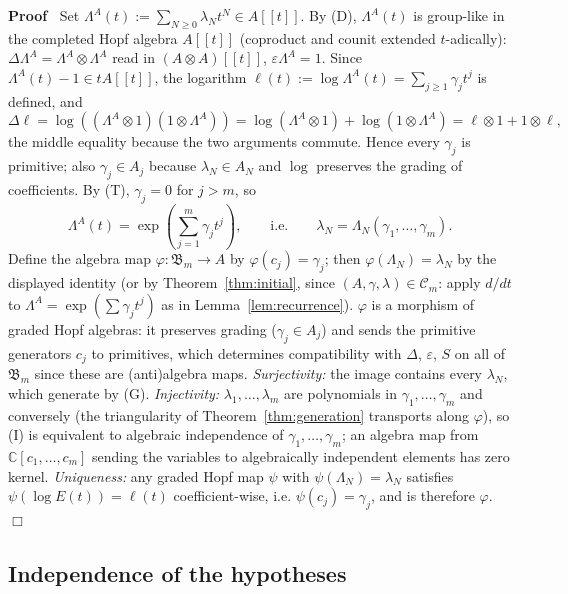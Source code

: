 \documentclass{article}
\newcommand{\assign}{:=}
\newcommand{\tmem}[1]{{\em #1\/}}
\newenvironment{proof}{\noindent\textbf{Proof\ }}{\hspace*{\fill}$\Box$\medskip}
\newcommand{\CA}{\mathfrak{B}}
\newcommand{\C}{\mathbb{C}}
\begin{document}
\begin{proof}
  Set $\Lambda^A (t) \assign \sum_{N \ge 0} \lambda_N t^N \in A [[t]]$. By
  (D), $\Lambda^A (t)$ is group-like in the completed Hopf algebra $A [[t]]$
  (coproduct and counit extended $t$-adically): $\Delta \Lambda^A = \Lambda^A
  \otimes \Lambda^A$ read in $(A \otimes A) [[t]]$, $\varepsilon \Lambda^A =
  1$. Since $\Lambda^A (t) - 1 \in tA [[t]]$, the logarithm $\ell (t) \assign
  \log \Lambda^A (t) = \sum_{j \ge 1} \gamma_j t^j$ is defined, and
  \[ \Delta \ell = \log ((\Lambda^A \otimes 1) (1 \otimes \Lambda^A)) = \log
     (\Lambda^A \otimes 1) + \log (1 \otimes \Lambda^A) = \ell \otimes 1 + 1
     \otimes \ell, \]
  the middle equality because the two arguments commute. Hence every
  $\gamma_j$ is primitive; also $\gamma_j \in A_j$ because $\lambda_N \in A_N$
  and $\log$ preserves the grading of coefficients. By (T), $\gamma_j = 0$ for
  $j > m$, so
  \[ \Lambda^A (t) = \exp \left( \sum_{j = 1}^m \gamma_j t^j \right), \qquad
     \text{i.e.} \qquad \lambda_N = \Lambda_N  (\gamma_1, \ldots, \gamma_m) .
  \]
  Define the algebra map $\varphi : \CA_m \to A$ by $\varphi (c_j) =
  \gamma_j$; then $\varphi (\Lambda_N) = \lambda_N$ by the displayed identity
  (or by Theorem~\ref{thm:initial}, since $(A, \gamma, \lambda) \in
  \mathcal{C}_m$: apply $d / dt$ to $\Lambda^A = \exp (\sum \gamma_j t^j)$ as
  in Lemma~\ref{lem:recurrence}). $\varphi$ is a morphism of graded Hopf
  algebras: it preserves grading ($\gamma_j \in A_j$) and sends the primitive
  generators $c_j$ to primitives, which determines compatibility with
  $\Delta$, $\varepsilon$, $S$ on all of $\CA_m$ since these are (anti)algebra
  maps. {\tmem{Surjectivity:}} the image contains every $\lambda_N$, which
  generate by (G). {\tmem{Injectivity:}} $\lambda_1, \ldots, \lambda_m$ are
  polynomials in $\gamma_1, \ldots, \gamma_m$ and conversely (the
  triangularity of Theorem~\ref{thm:generation} transports along $\varphi$),
  so (I) is equivalent to algebraic independence of $\gamma_1, \ldots,
  \gamma_m$; an algebra map from $\C [c_1, \ldots, c_m]$ sending the variables
  to algebraically independent elements has zero kernel. {\tmem{Uniqueness:}}
  any graded Hopf map $\psi$ with $\psi (\Lambda_N) = \lambda_N$ satisfies
  $\psi (\log E (t)) = \ell (t)$ coefficient-wise, i.e. $\psi (c_j) =
  \gamma_j$, and is therefore $\varphi$.
\end{proof}

\subsection{Independence of the hypotheses}
\end{document}
